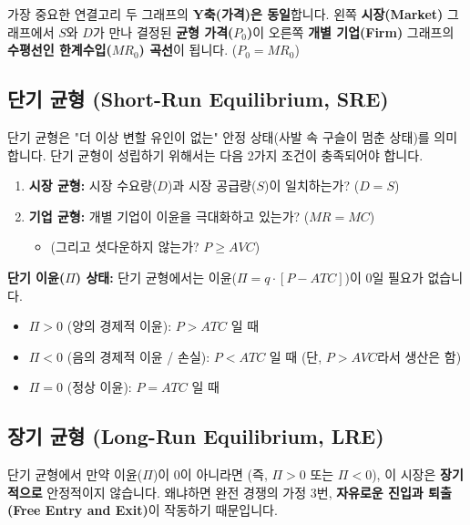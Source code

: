 \documentclass[11pt,a4paper]{article}
\theoremstyle{definition}
\begin{document}
\begin{mybox}{가장 중요한 연결고리}
두 그래프의 \textbf{Y축(가격)은 동일}합니다.
왼쪽 \textbf{시장(Market)} 그래프에서 $S$와 $D$가 만나 결정된 \textbf{균형 가격($P_0$)}이
오른쪽 \textbf{개별 기업(Firm)} 그래프의 \textbf{수평선인 한계수입($MR_0$) 곡선}이 됩니다.
($P_0 = MR_0$)
\end{mybox}

\subsection{단기 균형 (Short-Run Equilibrium, SRE)}

단기 균형은 "더 이상 변할 유인이 없는" 안정 상태(사발 속 구슬이 멈춘 상태)를 의미합니다.
단기 균형이 성립하기 위해서는 다음 2가지 조건이 충족되어야 합니다.

\begin{enumerate}
    \item \textbf{시장 균형:} 시장 수요량($D$)과 시장 공급량($S$)이 일치하는가? ($D=S$)
    \item \textbf{기업 균형:} 개별 기업이 이윤을 극대화하고 있는가? ($MR=MC$)
    \begin{itemize}
        \item (그리고 셧다운하지 않는가? $P \ge AVC$)
    \end{itemize}
\end{enumerate}

\textbf{단기 이윤($\Pi$) 상태:}
단기 균형에서는 이윤($\Pi = q \cdot [P - ATC]$)이 0일 필요가 없습니다.
\begin{itemize}
    \item $\Pi > 0$ (양의 경제적 이윤): $P > ATC$ 일 때
    \item $\Pi < 0$ (음의 경제적 이윤 / 손실): $P < ATC$ 일 때 (단, $P > AVC$라서 생산은 함)
    \item $\Pi = 0$ (정상 이윤): $P = ATC$ 일 때
\end{itemize}

\subsection{장기 균형 (Long-Run Equilibrium, LRE)}

단기 균형에서 만약 이윤($\Pi$)이 0이 아니라면 (즉, $\Pi > 0$ 또는 $\Pi < 0$),
이 시장은 \textbf{장기적으로} 안정적이지 않습니다.
왜냐하면 완전 경쟁의 가정 3번, \textbf{자유로운 진입과 퇴출(Free Entry and Exit)}이 작동하기 때문입니다.
\end{document}
